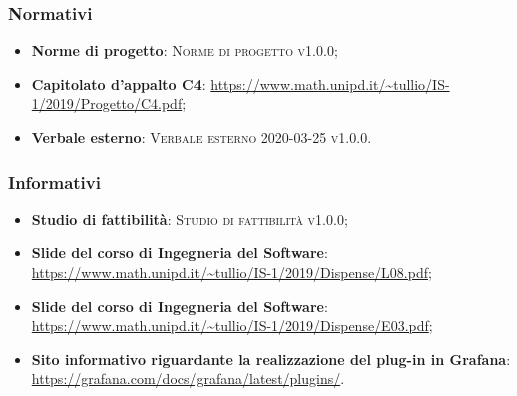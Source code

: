 \documentclass[../analisi-dei-requisiti.tex]{subfiles}
\begin{document}
\subsubsection{Normativi}%
\label{sssec:normativi}

\begin{itemize}
  \item \textbf{Norme di progetto}: \textsc{Norme di progetto v1.0.0};
  \item \textbf{Capitolato d'appalto C4}: \url{https://www.math.unipd.it/~tullio/IS-1/2019/Progetto/C4.pdf};
  \item \textbf{Verbale esterno}: \textsc{Verbale esterno 2020-03-25 v1.0.0}.
\end{itemize}

\subsubsection{Informativi}%
\label{sssec:informativi}

\begin{itemize}
  \item \textbf{Studio di fattibilità}: \textsc{Studio di fattibilità v1.0.0};
  \item \textbf{Slide del corso di Ingegneria del Software}: \url{https://www.math.unipd.it/~tullio/IS-1/2019/Dispense/L08.pdf};
  \item \textbf{Slide del corso di Ingegneria del Software}: \url{https://www.math.unipd.it/~tullio/IS-1/2019/Dispense/E03.pdf};
  \item \textbf{Sito informativo riguardante la realizzazione del plug-in in Grafana}: \url{https://grafana.com/docs/grafana/latest/plugins/}.
\end{itemize}
\end{document}
